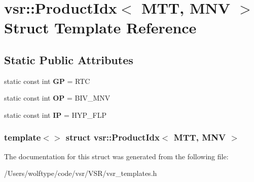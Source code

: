 \hypertarget{structvsr_1_1_product_idx_3_01_m_t_t_00_01_m_n_v_01_4}{\section{vsr\-:\-:Product\-Idx$<$ M\-T\-T, M\-N\-V $>$ Struct Template Reference}
\label{structvsr_1_1_product_idx_3_01_m_t_t_00_01_m_n_v_01_4}
}
\subsection*{Static Public Attributes}
\begin{DoxyCompactItemize}
\item 
\hypertarget{structvsr_1_1_product_idx_3_01_m_t_t_00_01_m_n_v_01_4_ac666fb56c90adbbcf4836ea6b1be37a3}{static const int {\bfseries G\-P} = R\-T\-C}\label{structvsr_1_1_product_idx_3_01_m_t_t_00_01_m_n_v_01_4_ac666fb56c90adbbcf4836ea6b1be37a3}

\item 
\hypertarget{structvsr_1_1_product_idx_3_01_m_t_t_00_01_m_n_v_01_4_a93318336471f6a1faeb3f82ab77c9946}{static const int {\bfseries O\-P} = B\-I\-V\-\_\-\-M\-N\-V}\label{structvsr_1_1_product_idx_3_01_m_t_t_00_01_m_n_v_01_4_a93318336471f6a1faeb3f82ab77c9946}

\item 
\hypertarget{structvsr_1_1_product_idx_3_01_m_t_t_00_01_m_n_v_01_4_a14092c3fb88fb38b414f47c7ff9b1285}{static const int {\bfseries I\-P} = H\-Y\-P\-\_\-\-F\-L\-P}\label{structvsr_1_1_product_idx_3_01_m_t_t_00_01_m_n_v_01_4_a14092c3fb88fb38b414f47c7ff9b1285}

\end{DoxyCompactItemize}
\subsubsection*{template$<$$>$ struct vsr\-::\-Product\-Idx$<$ M\-T\-T, M\-N\-V $>$}



The documentation for this struct was generated from the following file\-:\begin{DoxyCompactItemize}
\item 
/\-Users/wolftype/code/vsr/\-V\-S\-R/vsr\-\_\-templates.\-h\end{DoxyCompactItemize}
